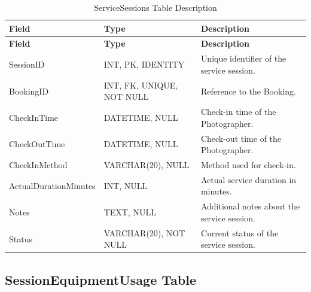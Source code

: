 \begin{longtable}{
		|>{\raggedright\arraybackslash}p{3.2cm}|
		>{\raggedright\arraybackslash}p{4.2cm}|
		>{\raggedright\arraybackslash}p{5.0cm}|
	}
	\caption{ServiceSessions Table Description}
	\label{tab:service-sessions}\\
	\hline
	\textbf{Field} & \textbf{Type} & \textbf{Description} \\ \hline
	\endfirsthead
	\hline
	\textbf{Field} & \textbf{Type} & \textbf{Description} \\ \hline
	\endhead
	
	SessionID & INT, PK, IDENTITY &
	Unique identifier of the service session. \\ \hline
	
	BookingID & INT, FK, UNIQUE, NOT NULL &
	Reference to the Booking. \\ \hline
	
	CheckInTime & DATETIME, NULL &
	Check-in time of the Photographer. \\ \hline
	
	CheckOutTime & DATETIME, NULL &
	Check-out time of the Photographer. \\ \hline
	
	CheckInMethod & VARCHAR(20), NULL &
	Method used for check-in. \\ \hline
	
	ActualDurationMinutes & INT, NULL &
	Actual service duration in minutes. \\ \hline
	
	Notes & TEXT, NULL &
	Additional notes about the service session. \\ \hline
	
	Status & VARCHAR(20), NOT NULL &
	Current status of the service session. \\ \hline
	
\end{longtable}


\subsection{SessionEquipmentUsage Table}

